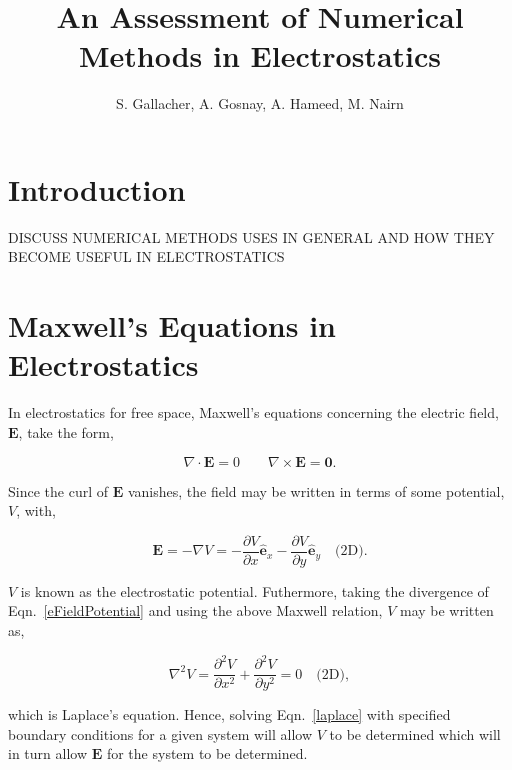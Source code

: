 \documentclass{article}
\renewcommand{\vec}[1]{\mathbf{#1}}
\let\oldhat\hat
\newcommand{\basis}[1]{\oldhat{\mathbf{#1}}}
\begin{document}
\title{An Assessment of Numerical Methods in Electrostatics}
\author{S. Gallacher, A. Gosnay, A. Hameed, M. Nairn}
\maketitle


\tableofcontents

\newpage

\begin{abstract}



\end{abstract}




\section{Introduction}

DISCUSS NUMERICAL METHODS USES IN GENERAL AND HOW THEY BECOME USEFUL IN ELECTROSTATICS


\section{Maxwell's Equations in Electrostatics}

In electrostatics for free space, Maxwell's equations concerning the electric field, $\vec{E}$, take the form,

$$
\nabla \cdot \vec{E} = 0 \quad \quad \nabla \times \vec{E} = \vec{0}.
$$

Since the curl of $\vec{E}$ vanishes, the field may be written in terms of some potential, $V$, with,

\begin{equation}
\vec{E} = - \nabla V = -\frac{\partial V}{\partial x} \basis{e}_x - \frac{\partial V}{\partial y} \basis{e}_y \quad \text{(2D)}.
\label{eFieldPotential}
\end{equation}

$V$ is known as the electrostatic potential. Futhermore, taking the divergence of Eqn.~\ref{eFieldPotential} and using the above Maxwell relation, $V$ may be written as,

\begin{equation} 
\nabla^2 V = \frac{\partial^2 V}{\partial x^2} + \frac{\partial^2 V}{\partial y^2} = 0 \quad \text{(2D)},
\label{laplace}
\end{equation}

\noindent which is Laplace's equation. Hence, solving Eqn.~\ref{laplace} with specified boundary conditions for a given system will allow $V$ to be determined which will in turn allow $\vec{E}$ for the system to be determined.
\end{document}
